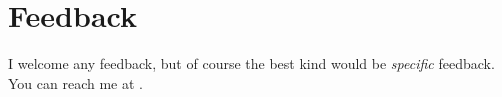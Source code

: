 \section{Feedback}
\label{sec:feedback}

I welcome any feedback, but of course the best kind would be \emph{specific} feedback.
You can reach me at .


